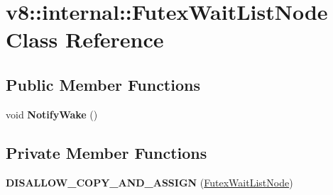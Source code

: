 \hypertarget{classv8_1_1internal_1_1_futex_wait_list_node}{}\section{v8\+:\+:internal\+:\+:Futex\+Wait\+List\+Node Class Reference}
\label{classv8_1_1internal_1_1_futex_wait_list_node}
\subsection*{Public Member Functions}
\begin{DoxyCompactItemize}
\item 
void {\bfseries Notify\+Wake} ()\hypertarget{classv8_1_1internal_1_1_futex_wait_list_node_ac310901c8f49584034847958877782ab}{}\label{classv8_1_1internal_1_1_futex_wait_list_node_ac310901c8f49584034847958877782ab}

\end{DoxyCompactItemize}
\subsection*{Private Member Functions}
\begin{DoxyCompactItemize}
\item 
{\bfseries D\+I\+S\+A\+L\+L\+O\+W\+\_\+\+C\+O\+P\+Y\+\_\+\+A\+N\+D\+\_\+\+A\+S\+S\+I\+GN} (\hyperlink{classv8_1_1internal_1_1_futex_wait_list_node}{Futex\+Wait\+List\+Node})\hypertarget{classv8_1_1internal_1_1_futex_wait_list_node_a625cc32c14de65c0b5a5c8a7eaf51cc3}{}\label{classv8_1_1internal_1_1_futex_wait_list_node_a625cc32c14de65c0b5a5c8a7eaf51cc3}

\end{DoxyCompactItemize}
